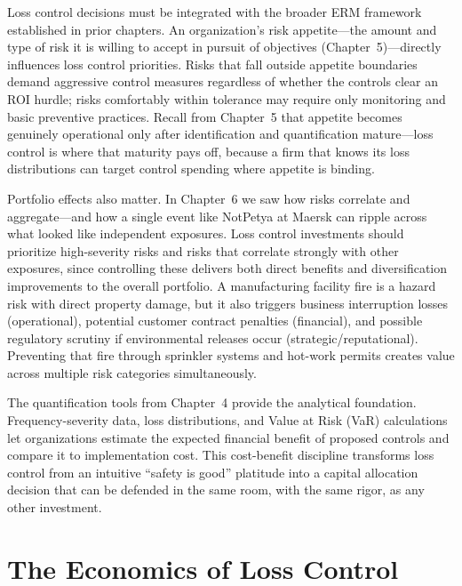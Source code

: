 \documentclass[11pt,openany]{book}
\begin{document}
Loss control decisions must be integrated with the broader ERM framework
established in prior chapters. An organization's risk appetite---the amount
and type of risk it is willing to accept in pursuit of objectives
(Chapter~5)---directly influences loss control priorities. Risks that fall
outside appetite boundaries demand aggressive control measures regardless of
whether the controls clear an ROI hurdle; risks comfortably within tolerance
may require only monitoring and basic preventive practices. Recall from
Chapter~5 that appetite becomes genuinely operational only after
identification and quantification mature---loss control is where that maturity
pays off, because a firm that knows its loss distributions can target control
spending where appetite is binding.

Portfolio effects also matter. In Chapter~6 we saw how risks correlate and
aggregate---and how a single event like NotPetya at Maersk can ripple across
what looked like independent exposures. Loss control investments should
prioritize high-severity risks and risks that correlate strongly with other
exposures, since controlling these delivers both direct benefits and
diversification improvements to the overall portfolio. A manufacturing
facility fire is a hazard risk with direct property damage, but it also
triggers business interruption losses (operational), potential customer
contract penalties (financial), and possible regulatory scrutiny if
environmental releases occur (strategic/reputational). Preventing that fire
through sprinkler systems and hot-work permits creates value across multiple
risk categories simultaneously.

The quantification tools from Chapter~4 provide the analytical foundation.
Frequency-severity data, loss distributions, and Value at Risk (VaR)
calculations let organizations estimate the expected financial benefit of
proposed controls and compare it to implementation cost. This cost-benefit
discipline transforms loss control from an intuitive ``safety is good''
platitude into a capital allocation decision that can be defended in the same
room, with the same rigor, as any other investment.

\section{The Economics of Loss Control}
\label{sec:loss-control-economics}
\end{document}
